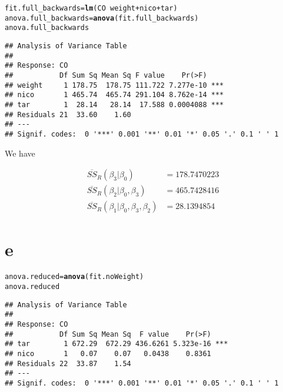 \documentclass{article}\usepackage[]{graphicx}\usepackage[]{color}
\makeatletter
\newcommand{\hlopt}[1]{\textcolor[rgb]{0,0,0}{#1}}%
\newcommand{\hlstd}[1]{\textcolor[rgb]{0.345,0.345,0.345}{#1}}%
\newcommand{\hlkwb}[1]{\textcolor[rgb]{0.69,0.353,0.396}{#1}}%
\newcommand{\hlkwd}[1]{\textcolor[rgb]{0.737,0.353,0.396}{\textbf{#1}}}%
\newenvironment{kframe}{%
 \def\at@end@of@kframe{}%
 \ifinner\ifhmode%
  \def\at@end@of@kframe{\end{minipage}}%
  \begin{minipage}{\columnwidth}%
 \fi\fi%
 \def\FrameCommand##1{\hskip\@totalleftmargin \hskip-\fboxsep
 \colorbox{shadecolor}{##1}\hskip-\fboxsep
     \hskip-\linewidth \hskip-\@totalleftmargin \hskip\columnwidth}%
 \MakeFramed {\advance\hsize-\width
   \@totalleftmargin\z@ \linewidth\hsize
   \@setminipage}}%
 {\par\unskip\endMakeFramed%
 \at@end@of@kframe}
\newenvironment{knitrout}{}{} %
\makeatother
\begin{document}
\begin{knitrout}
\color{fgcolor}\begin{kframe}
\begin{alltt}
\hlstd{fit.full_backwards} \hlkwb{=} \hlkwd{lm}\hlstd{(CO} \hlopt{~} \hlstd{weight} \hlopt{+} \hlstd{nico} \hlopt{+} \hlstd{tar)}
\hlstd{anova.full_backwards} \hlkwb{=} \hlkwd{anova}\hlstd{(fit.full_backwards)}
\hlstd{anova.full_backwards}
\end{alltt}
\begin{verbatim}
## Analysis of Variance Table
## 
## Response: CO
##           Df Sum Sq Mean Sq F value    Pr(>F)    
## weight     1 178.75  178.75 111.722 7.277e-10 ***
## nico       1 465.74  465.74 291.104 8.762e-14 ***
## tar        1  28.14   28.14  17.588 0.0004088 ***
## Residuals 21  33.60    1.60                      
## ---
## Signif. codes:  0 '***' 0.001 '**' 0.01 '*' 0.05 '.' 0.1 ' ' 1
\end{verbatim}
\end{kframe}
\end{knitrout}
We have 

\begin{align}
\overline{SS}_R (\beta_3 \vert \beta_0) &= 178.7470223\\
\overline{SS}_R (\beta_2 \vert \beta_0, \beta_3) &= 465.7428416\\
\overline{SS}_R (\beta_1 \vert \beta_0, \beta_3, \beta_2) &= 28.1394854
\end{align}

\clearpage

\section*{e}

\begin{knitrout}
\color{fgcolor}\begin{kframe}
\begin{alltt}
\hlstd{anova.reduced} \hlkwb{=} \hlkwd{anova}\hlstd{(fit.noWeight)}
\hlstd{anova.reduced}
\end{alltt}
\begin{verbatim}
## Analysis of Variance Table
## 
## Response: CO
##           Df Sum Sq Mean Sq  F value    Pr(>F)    
## tar        1 672.29  672.29 436.6261 5.323e-16 ***
## nico       1   0.07    0.07   0.0438    0.8361    
## Residuals 22  33.87    1.54                       
## ---
## Signif. codes:  0 '***' 0.001 '**' 0.01 '*' 0.05 '.' 0.1 ' ' 1
\end{verbatim}
\end{kframe}
\end{knitrout}
\end{document}
